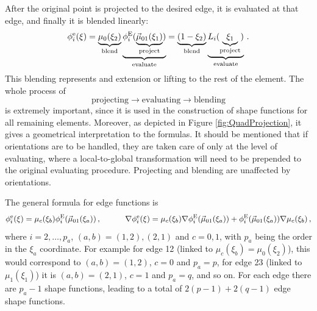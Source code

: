 After the original point is projected to the desired edge, it is evaluated at that edge, and finally it is blended linearly:
\begin{equation*}
    \phi_i^\mathrm{e}(\xi)=\underbrace{\mu_0(\xi_2)}_{\text{blend}}
        \underbrace{\phi_i^{\mathrm{E}}(\underbrace{\vec{\mu}_{01}(\xi_1)}_{\text{project}})}_{\text{evaluate}}
    	=\underbrace{(1-\xi_2)}_{\text{blend}}\underbrace{L_i(\underbrace{\xi_1}_{\text{project}})}_{\text{evaluate}}\,.
\end{equation*}
This blending represents and extension or lifting to the rest of the element.
The whole process of
\begin{equation*}
	\text{projecting}\longrightarrow\text{evaluating}\longrightarrow\text{blending}
\end{equation*}
is extremely important, since it is used in the construction of shape functions for all remaining elements. 
Moreover, as depicted in Figure \ref{fig:QuadProjection}, it gives a geometrical interpretation to the formulas. 
It should be mentioned that if orientations are to be handled, they are taken care of only at the level of evaluating, where a local-to-global transformation will need to be prepended to the original evaluating procedure.
Projecting and blending are unaffected by orientations.

The general formula for edge functions is
\begin{equation}
    \phi_i^\mathrm{e}(\xi)=\mu_c(\xi_b)\phi_i^{\mathrm{E}}(\vec{\mu}_{01}(\xi_a))\,,\quad\qquad
    	\nabla\phi_i^\mathrm{e}(\xi)=\mu_c(\xi_b)\nabla\phi_i^{\mathrm{E}}(\vec{\mu}_{01}(\xi_a))
        +\phi_i^{\mathrm{E}}(\vec{\mu}_{01}(\xi_a))\nabla\mu_c(\xi_b)\,,\label{eq:QuadH1Edge}
\end{equation}
where $i=2,\ldots,p_a$, $(a,b)=(1,2),(2,1)$ and $c=0,1$, with $p_a$ being the order in the $\xi_a$ coordinate. 
For example for edge 12 (linked to $\mu_c(\xi_b)=\mu_0(\xi_2)$), this would correspond to $(a,b)=(1,2)$, $c=0$ and $p_a=p$, for edge 23 (linked to $\mu_1(\xi_1)$) it is $(a,b)=(2,1)$, $c=1$ and $p_a=q$, and so on. 
For each edge there are $p_a-1$ shape functions, leading to a total of $2(p-1)+2(q-1)$ edge shape functions.

